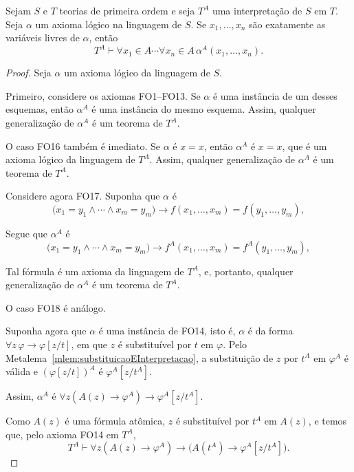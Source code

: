 \begin{metalemma}\label{mlem:axiomasLogicosInterpretacao}
    Sejam $S$ e $T$ teorias de primeira ordem e seja $T^A$ uma interpretação de $S$ em $T$.
    Seja $\alpha$ um axioma lógico na linguagem de $S$.
    Se $x_1,\dots,x_n$ são exatamente as variáveis livres de $\alpha$, então
    \[
        T^A\vdash \forall x_1\in A\cdots \forall x_n\in A\,\alpha^A(x_1, \dots, x_n).
    \]
\end{metalemma}

\begin{proof}
    Seja $\alpha$ um axioma lógico da linguagem de $S$.

    Primeiro, considere os axiomas FO1--FO13.
    Se $\alpha$ é uma instância de um desses esquemas, então $\alpha^A$ é uma instância do mesmo esquema.
    Assim, qualquer generalização de $\alpha^A$ é um teorema de $T^A$.

    O caso FO16 também é imediato.
    Se $\alpha$ é $x=x$, então $\alpha^A$ é $x=x$, que é um axioma lógico da linguagem de $T^A$.
    Assim, qualquer generalização de $\alpha^A$ é um teorema de $T^A$.

    Considere agora FO17.
    Suponha que $\alpha$ é
    \[
        \bigl(x_1=y_1\wedge\cdots\wedge x_m=y_m\bigr)
        \to
        f(x_1,\dots,x_m)=f(y_1,\dots,y_m),
    \]

    Segue que $\alpha^A$ é
    \[
        \bigl(x_1=y_1\wedge\cdots\wedge x_m=y_m\bigr)
        \to
        f^A(x_1,\dots,x_m)=f^A(y_1,\dots,y_m),
    \]

    Tal fórmula é um axioma da linguagem de $T^A$, e, portanto, qualquer generalização de $\alpha^A$ é um teorema de $T^A$.

    O caso FO18 é análogo.

    Suponha agora que $\alpha$ é uma instância de FO14, isto é, $\alpha$ é da forma $\forall z\,\varphi\to \varphi[z/t]$,
    em que $z$ é substituível por $t$ em $\varphi$.
    Pelo Metalema~\ref{mlem:substituicaoEInterpretacao}, a substituição de $z$ por $t^A$ em $\varphi^A$ é válida e $(\varphi[z/t])^A$ é $\varphi^A[z/t^A]$.

    Assim, $\alpha^A$ é $\forall z(A(z)\to\varphi^A)\to \varphi^A[z/t^A]$.

    Como $A(z)$ é uma fórmula atômica, $z$ é substituível por $t^A$ em $A(z)$, e temos que, pelo axioma FO14 em $T^A$,
    \[
        T^A\vdash
        \forall z(A(z)\to\varphi^A)
        \to
        \bigl(A(t^A)\to\varphi^A[z/t^A]\bigr).
    \]


\end{proof}
